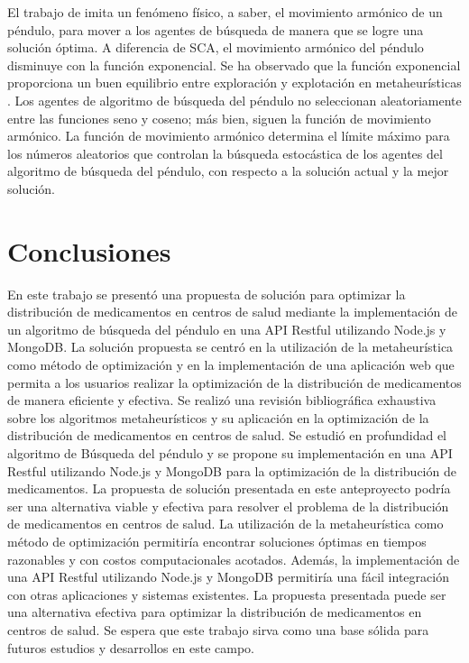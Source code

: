 \documentclass[conference]{IEEEtran}
\begin{document}
El trabajo de \cite{aziz2022} imita un fenómeno físico, a saber, el movimiento
armónico
de un péndulo, para mover a los agentes de búsqueda de manera que se logre una
solución óptima. A diferencia de SCA, el movimiento armónico del péndulo
disminuye con la función exponencial. Se ha observado que la función
exponencial proporciona un buen equilibrio entre exploración y explotación en
metaheurísticas \cite{aziz2018singlesolution, rahman2018singleagent}. Los
agentes de algoritmo de búsqueda del péndulo no seleccionan aleatoriamente
entre
las funciones seno y coseno; más bien, siguen la función de movimiento
armónico. La función de movimiento armónico determina el límite máximo para los
números aleatorios que controlan la búsqueda estocástica de los agentes del
algoritmo de búsqueda del péndulo,
con respecto a la solución actual y la mejor solución.

\section{Conclusiones}
\label{sec:Conclusiones}
En este trabajo se presentó una propuesta de solución para optimizar la
distribución de medicamentos en centros de salud mediante la implementación de
un algoritmo de búsqueda del péndulo en una API Restful utilizando
Node.js y MongoDB. La solución propuesta se centró en la utilización de la
metaheurística como método de optimización y en la implementación de una
aplicación web que permita a los usuarios realizar la optimización de la
distribución de medicamentos de manera eficiente y efectiva.
Se realizó una revisión bibliográfica exhaustiva sobre los algoritmos
metaheurísticos y su aplicación en la optimización de la distribución de
medicamentos en centros de salud. Se estudió en profundidad el algoritmo de
Búsqueda del péndulo y se propone su implementación en una API Restful
utilizando Node.js y MongoDB para la optimización de la distribución de
medicamentos.
La propuesta de solución presentada en este anteproyecto podría ser una
alternativa viable y efectiva para resolver el problema de la distribución de
medicamentos en centros de salud. La utilización de la metaheurística como
método de optimización permitiría encontrar soluciones óptimas en tiempos
razonables y con costos computacionales acotados. Además, la implementación de
una API Restful utilizando Node.js y MongoDB permitiría una fácil integración
con otras aplicaciones y sistemas existentes.
La propuesta presentada puede ser una alternativa efectiva para optimizar la
distribución de medicamentos en centros de salud. Se espera que este trabajo
sirva como una base sólida para futuros estudios y desarrollos en este campo.

\renewcommand\refname{Referencias}


\end{document}
